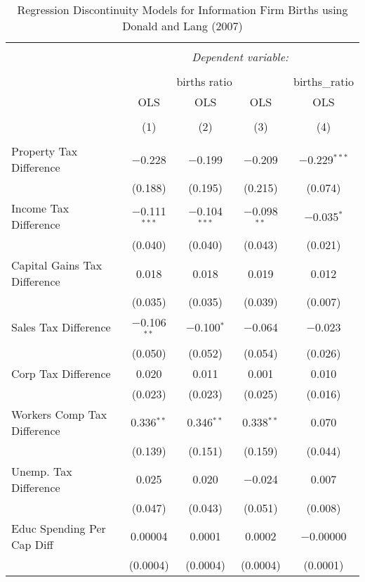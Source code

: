 
\begin{table}[!htbp] \centering 
  \caption{Regression Discontinuity Models for  Information Firm Births using Donald and Lang (2007)} 
  \label{} 
\begin{tabular}{@{\extracolsep{5pt}}lcccc} 
\\[-1.8ex]\hline 
\hline \\[-1.8ex] 
 & \multicolumn{4}{c}{\textit{Dependent variable:}} \\ 
\cline{2-5} 
\\[-1.8ex] & \multicolumn{3}{c}{births ratio} & births\_ratio \\ 
 & OLS & OLS & OLS & OLS \\ 
\\[-1.8ex] & (1) & (2) & (3) & (4)\\ 
\hline \\[-1.8ex] 
 Property Tax Difference & $-$0.228 & $-$0.199 & $-$0.209 & $-$0.229$^{***}$ \\ 
  & (0.188) & (0.195) & (0.215) & (0.074) \\ 
  Income Tax Difference & $-$0.111$^{***}$ & $-$0.104$^{***}$ & $-$0.098$^{**}$ & $-$0.035$^{*}$ \\ 
  & (0.040) & (0.040) & (0.043) & (0.021) \\ 
  Capital Gains Tax Difference & 0.018 & 0.018 & 0.019 & 0.012 \\ 
  & (0.035) & (0.035) & (0.039) & (0.007) \\ 
  Sales Tax Difference & $-$0.106$^{**}$ & $-$0.100$^{*}$ & $-$0.064 & $-$0.023 \\ 
  & (0.050) & (0.052) & (0.054) & (0.026) \\ 
  Corp Tax Difference & 0.020 & 0.011 & 0.001 & 0.010 \\ 
  & (0.023) & (0.023) & (0.025) & (0.016) \\ 
  Workers Comp Tax Difference & 0.336$^{**}$ & 0.346$^{**}$ & 0.338$^{**}$ & 0.070 \\ 
  & (0.139) & (0.151) & (0.159) & (0.044) \\ 
  Unemp. Tax Difference & 0.025 & 0.020 & $-$0.024 & 0.007 \\ 
  & (0.047) & (0.043) & (0.051) & (0.008) \\ 
  Educ Spending Per Cap Diff & 0.00004 & 0.0001 & 0.0002 & $-$0.00000 \\ 
  & (0.0004) & (0.0004) & (0.0004) & (0.0001) \\ 

\end{tabular}
\end{table}
